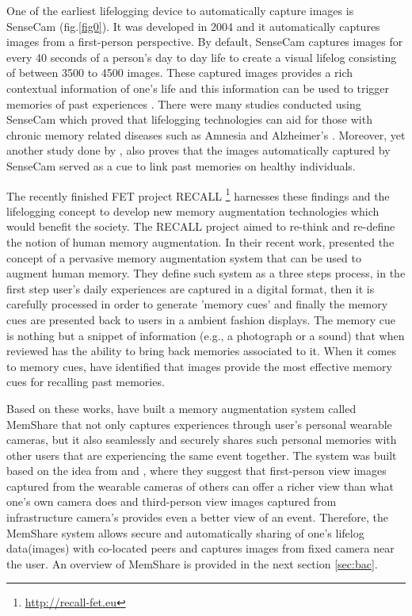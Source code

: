 \documentclass[mscthesis]{usiinfthesis}
\begin{document}
One of the earliest lifelogging device to automatically capture images is SenseCam (fig.\ref{fig0}). It was developed in 2004 and it automatically captures images from a first-person perspective. By default, SenseCam captures images for every 40 seconds of a person's day to day life to create a visual lifelog consisting of between 3500 to 4500 images. These captured images provides a rich contextual information of one's life and this information can be used to trigger memories of past experiences \citep{gurrin_lifelogging:_2014}. There were many studies conducted using SenseCam which proved that lifelogging technologies can aid for those with chronic memory related diseases such as Amnesia and Alzheimer's  \citep{berry_use_2007} \citep{doi:10.1080/09658211.2014.886703}. Moreover, yet another study done by \citeauthor{sellen_life-logging_2007}, also proves that the images automatically captured by SenseCam served as a cue to link past memories on healthy individuals. 

The recently finished FET project RECALL \footnote{\url{http://recall-fet.eu}} harnesses these findings and the lifelogging concept to develop new memory augmentation technologies which would benefit the society. The RECALL project aimed to re-think and re-define the notion of human memory augmentation. In their recent work, \citeauthor{davies_security_2015} presented the concept of a pervasive memory augmentation system that can be used to augment human memory. They define such system as a three steps process, in the first step user's daily experiences are captured in a digital format, then it is carefully processed in order to generate 'memory cues' and finally the memory cues are presented back to users in a ambient fashion displays. The memory cue is nothing but a snippet of information (e.g., a photograph or a sound) that when reviewed has the ability to bring back memories associated to it. When it comes to memory cues, \citeauthor{dingler_multimedia_2016} have identified that images provide the most effective memory cues for recalling past memories.

Based on these works, \citeauthor{bexheti_secure_2016} have built a memory augmentation system called MemShare that not only captures experiences through user's personal wearable cameras, but it also seamlessly and securely shares such personal memories with other users that are experiencing the same event together. The system was built based on the idea from \citeauthor{clinch_lifelogging_2014} and \citeauthor{byrne_life_2011}, where they suggest that first-person view images captured from the wearable cameras of others can offer a richer view than what one's own camera does and third-person view images captured from infrastructure camera's provides even a better view of an event. Therefore, the MemShare system allows secure and automatically sharing of one's lifelog data(images) with co-located peers and captures images from fixed camera near the user. An overview of MemShare is provided in the next section \ref{sec:bac}.
 
\end{document}
